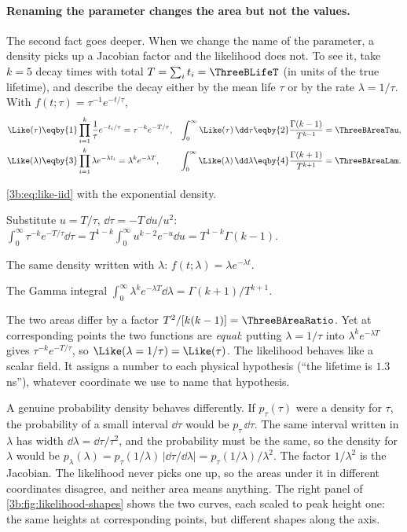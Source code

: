 \paragraph{Renaming the parameter changes the area but not the values.}
The second fact goes deeper. When we change the name of the parameter, a
density picks up a Jacobian factor and the likelihood does not. To see it,
take $k=5$ decay times with total $T=\sum_it_i=\ThreeBLifeT$ (in units of
the true lifetime), and describe the decay either by the mean life $\tau$ or
by the rate $\lambda=1/\tau$. With $f(t;\tau)=\tau^{-1}e^{-t/\tau}$,
\begin{align*}
  \Like(\tau)&\eqby{1}\prod_{i=1}^k\frac1\tau e^{-t_i/\tau}
   =\tau^{-k}e^{-T/\tau},
  &\int_0^\infty\Like(\tau)\,\dd\tau
   &\eqby{2}\frac{\Gamma(k-1)}{T^{k-1}}=\ThreeBAreaTau,\\
  \Like(\lambda)&\eqby{3}\prod_{i=1}^k\lambda e^{-\lambda t_i}
   =\lambda^{k}e^{-\lambda T},
  &\int_0^\infty\Like(\lambda)\,\dd\lambda
   &\eqby{4}\frac{\Gamma(k+1)}{T^{k+1}}=\ThreeBAreaLam .
\end{align*}
\begin{explain}
  \item \eqref{3b:eq:like-iid} with the exponential density.
  \item Substitute $u=T/\tau$, $\dd\tau=-T\,\dd u/u^2$:
        $\int_0^\infty\tau^{-k}e^{-T/\tau}\dd\tau
        =T^{1-k}\int_0^\infty u^{k-2}e^{-u}\dd u=T^{1-k}\Gamma(k-1)$.
  \item The same density written with $\lambda$: $f(t;\lambda)=\lambda e^{-\lambda t}$.
  \item The Gamma integral $\int_0^\infty\lambda^ke^{-\lambda T}\dd\lambda
        =\Gamma(k+1)/T^{k+1}$.
\end{explain}
The two areas differ by a factor $T^2/[k(k-1)]=\ThreeBAreaRatio$. Yet at
corresponding points the two functions are \emph{equal}: putting
$\lambda=1/\tau$ into $\lambda^ke^{-\lambda T}$ gives
$\tau^{-k}e^{-T/\tau}$, so $\Like(\lambda=1/\tau)=\Like(\tau)$. The
likelihood behaves like a scalar field. It assigns a number to each physical
hypothesis (``the lifetime is $1.3\,$ns''), whatever coordinate we use to
name that hypothesis.

A genuine probability density behaves differently. If $p_\tau(\tau)$ were a
density for $\tau$, the probability of a small interval $\dd\tau$ would be
$p_\tau\,\dd\tau$. The same interval written in $\lambda$ has width
$\dd\lambda=\dd\tau/\tau^2$, and the probability must be the same, so the
density for $\lambda$ would be
$p_\lambda(\lambda)=p_\tau(1/\lambda)\,|\dd\tau/\dd\lambda|
=p_\tau(1/\lambda)/\lambda^2$. The factor $1/\lambda^2$ is the Jacobian. The
likelihood never picks one up, so the areas under it in different
coordinates disagree, and neither area means anything. The right panel of
\cref{3b:fig:likelihood-shapes} shows the two curves, each scaled to peak
height one: the same heights at corresponding points, but different shapes
along the axis.

